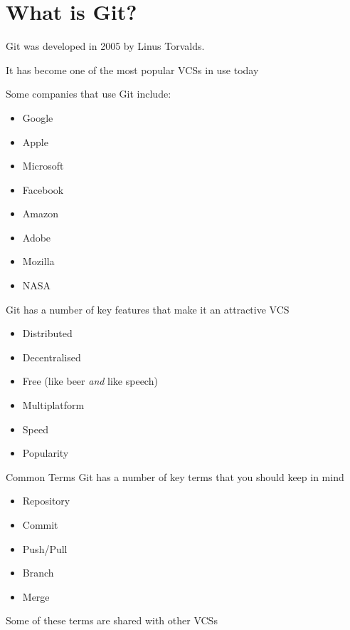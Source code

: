 \documentclass{beamer}
\begin{document}
\section{What is Git?}
\begin{frame}[allowframebreaks]{\secname}
    Git was developed in 2005 by Linus Torvalds.

    It has become one of the most popular VCSs in use today

    Some companies that use Git include:
    \begin{itemize}
        \item Google
        \item Apple
        \item Microsoft
        \item Facebook
        \item Amazon
        \item Adobe
        \item Mozilla
        \item NASA
    \end{itemize}

\framebreak
    
    Git has a number of key features that make it an attractive VCS
    \begin{itemize}
        \item Distributed
        \item Decentralised
        \item Free (like beer {\it and} like speech)
        \item Multiplatform
        \item Speed
        \item Popularity
    \end{itemize}
\end{frame}

\begin{frame}{Common Terms}
    Git has a number of key terms that you should keep in mind
    \begin{itemize}
        \item Repository 
        \item Commit
        \item Push/Pull
        \item Branch
        \item Merge
    \end{itemize}
    Some of these terms are shared with other VCSs
    \end{frame}
\end{document}

